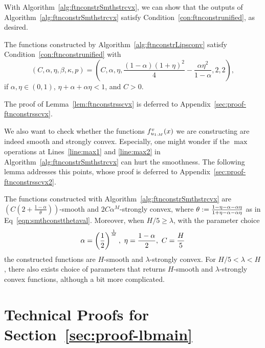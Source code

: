 With Algorithm~\ref{alg:ftnconstrSmthstrcvx}, we can show that the outputs of Algorithm~\ref{alg:ftnconstrSmthstrcvx} satisfy Condition~\ref{con:ftnconstrunified}, as desired.
\begin{lemma}
	\label{lem:ftnconstrsscvx}
	The functions constructed by Algorithm~\ref{alg:ftnconstrLipsconv} satisfy Condition~\ref{con:ftnconstrunified} with 
	\begin{equation*}
	(C, \alpha, \eta, \beta, \kappa, p) = \left (C, \alpha, \eta, \frac{(1-\alpha)(1+\eta)^2}{4} - \frac{\alpha \eta^2}{1-\alpha}, 2, 2 \right ),
	\end{equation*}
	if $\alpha, \eta \in (0,1)$, $\eta + \alpha + \alpha\eta < 1$, and $C>0$.
\end{lemma}
The proof of Lemma~\ref{lem:ftnconstrsscvx} is deferred to Appendix~\ref{sec:proof-ftnconstrsscvx}.

We also want to check whether the functions $f_{u_{1:M}}^v(x)$ we are constructing are indeed smooth and strongly convex. Especially, one might wonder if the $\max$ operations at Lines~\ref{line:max1} and \ref{line:max2} in Algorithm~\ref{alg:ftnconstrSmthstrcvx} can hurt the smoothness. The following lemma addresses this points, whose proof is deferred to Appendix~\ref{sec:proof-ftnconstrsscvx2}.
\begin{lemma}
	\label{lem:ftnconstrsscvx2}
	The functions constructed with Algorithm~\ref{alg:ftnconstrSmthstrcvx} are $\left (C \left ( 2 + \frac{1-\alpha}{\theta} \right )\right )$-smooth and $2C\alpha^M$-strongly convex, where 
	$\theta := \frac{1-\eta-\alpha-\alpha\eta}{1+\eta-\alpha-\alpha\eta}$ as in Eq~\eqref{eqn:smthconstthetaval}.
	Moreover, when $H/5 \geq \lambda$, with the parameter choice 
	\begin{equation*}
	\alpha = \left (\frac{1}{2} \right)^{\frac{1}{M}},~\eta = \frac{1-\alpha}{2},~C = \frac{H}{5}
	\end{equation*}
	the constructed functions are $H$-smooth and $\lambda$-strongly convex.
	For $H/5 < \lambda < H$, there also exists choice of parameters that returns $H$-smooth and $\lambda$-strongly convex functions, although a bit more complicated.
\end{lemma}


\section{Technical Proofs for Section~\ref{sec:proof-lbmain} }
\label{sec:defer-proof-lbmain}

